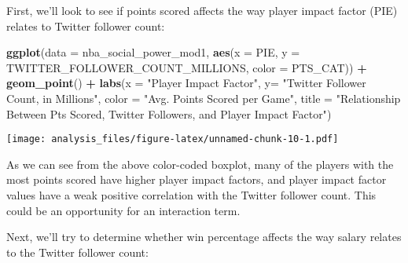 \documentclass[]{article}
\newenvironment{Shaded}{\begin{snugshade}}{\end{snugshade}}
\newcommand{\DataTypeTok}[1]{\textcolor[rgb]{0.13,0.29,0.53}{#1}}
\newcommand{\DecValTok}[1]{\textcolor[rgb]{0.00,0.00,0.81}{#1}}
\newcommand{\FloatTok}[1]{\textcolor[rgb]{0.00,0.00,0.81}{#1}}
\newcommand{\KeywordTok}[1]{\textcolor[rgb]{0.13,0.29,0.53}{\textbf{#1}}}
\newcommand{\NormalTok}[1]{#1}
\newcommand{\OperatorTok}[1]{\textcolor[rgb]{0.81,0.36,0.00}{\textbf{#1}}}
\newcommand{\StringTok}[1]{\textcolor[rgb]{0.31,0.60,0.02}{#1}}
\begin{document}
First, we'll look to see if points scored affects the way player impact
factor (PIE) relates to Twitter follower count:

\begin{Shaded}
\end{Shaded}

\begin{Shaded}
\begin{Highlighting}[]
\KeywordTok{ggplot}\NormalTok{(}\DataTypeTok{data =}\NormalTok{ nba_social_power_mod1,}
       \KeywordTok{aes}\NormalTok{(}\DataTypeTok{x =}\NormalTok{ PIE, }
           \DataTypeTok{y =}\NormalTok{ TWITTER_FOLLOWER_COUNT_MILLIONS,}
           \DataTypeTok{color =}\NormalTok{ PTS_CAT)) }\OperatorTok{+}
\StringTok{         }\KeywordTok{geom_point}\NormalTok{() }\OperatorTok{+}\StringTok{ }
\StringTok{  }\KeywordTok{labs}\NormalTok{(}\DataTypeTok{x =} \StringTok{"Player Impact Factor"}\NormalTok{,}
       \DataTypeTok{y=} \StringTok{"Twitter Follower Count, in Millions"}\NormalTok{, }
       \DataTypeTok{color =} \StringTok{"Avg. Points Scored per Game"}\NormalTok{,}
       \DataTypeTok{title =} \StringTok{"Relationship Between Pts Scored, Twitter Followers, and Player Impact Factor"}\NormalTok{)}
\end{Highlighting}
\end{Shaded}

\texttt{[image: analysis\_files/figure-latex/unnamed-chunk-10-1.pdf]}

As we can see from the above color-coded boxplot, many of the players
with the most points scored have higher player impact factors, and
player impact factor values have a weak positive correlation with the
Twitter follower count. This could be an opportunity for an interaction
term.

Next, we'll try to determine whether win percentage affects the way
salary relates to the Twitter follower count:

\begin{Shaded}
\end{Shaded}
\end{document}
